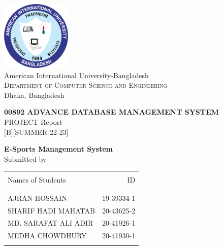 \begin{titlepage}

       \begin{center}
              \includegraphics[width=0.25\textwidth]{images/aiub-logo}\\[0.1in]
              \Large{American International University-Bangladesh}\\
              \normalsize
              \textsc{Department of Computer Science and Engineering}\\
              Dhaka, Bangladesh \\
              \vspace{1cm}

              \textup{\small {\bf 00892 ADVANCE DATABASE MANAGEMENT SYSTEM} \\PROJECT Report}\\[0.1in]
              [B][SUMMER 22-23]

              \vspace{1cm}
              \Large \textbf {E-Sports Management System}\\[0.2in]

              \normalsize Submitted by \\
              \begin{table}[h]
                     \centering
                     \begin{tabular}{lr}\hline                        \\
                            Names of Students    & ID         \\ \\ \hline
                            \\
                            AJRAN HOSSAIN        & 19-39334-1 \\
                            SHARIF HADI MAHATAB  & 20-43625-2 \\
                            MD. SARAFAT ALI ADIR & 20-41926-1 \\
                            MEDHA CHOWDHURY      & 20-41930-1 \\ \\ \hline
                     \end{tabular}
              \end{table}


\end{center}
\end{titlepage}
